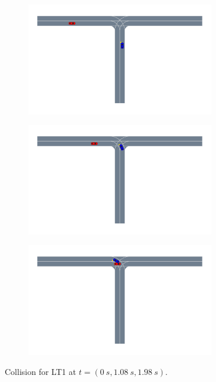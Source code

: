 \begin{figure}
    \centering
    \begin{subfigure}[t]{0.33\columnwidth}
        \centering
        \includegraphics[width=0.9\textwidth, trim={10cm 16.5cm 22cm 0},clip]{figures/interpretable_validation/2car_res1_frame_01.pdf}
    \end{subfigure}%
   \begin{subfigure}[t]{0.33\columnwidth}
        \centering
        \includegraphics[width=0.9\textwidth, trim={10cm 16.5cm 22cm 0},clip]{figures/interpretable_validation/2car_res1_frame_07.pdf}
    \end{subfigure}%
    \begin{subfigure}[t]{0.33\columnwidth}
        \centering
        \includegraphics[width=0.9\textwidth, trim={10cm 16.5cm 22cm 0},clip]{figures/interpretable_validation/2car_res1_frame_12.pdf}
    \end{subfigure}
    \caption{Collision for LT1 at $t=(\SI{0}{s}, \SI{1.08}{s}, \SI{1.98}{s})$.}
    \label{fig:2car_LT1}
    \vskip -0.2in
\end{figure}


